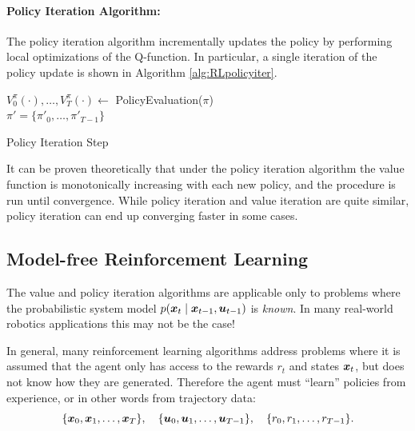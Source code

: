 \paragraph{Policy Iteration Algorithm:}
The policy iteration algorithm incrementally updates the policy by performing local optimizations of the Q-function. In particular, a single iteration of the policy update is shown in Algorithm \ref{alg:RLpolicyiter}.
\begin{algorithm}[ht]
 \KwData{$\pi$}
 $V^\pi_0(\cdot),\dots,V^\pi_T(\cdot) \xleftarrow{}$ PolicyEvaluation($\pi$)\\
 \Return $\pi' = \{\pi'_0, \dots, \pi'_{T-1} \}$
 \caption{Policy Iteration Step}
 \label{alg:RLpolicyiter}
\end{algorithm}
It can be proven theoretically that under the policy iteration algorithm the value function is monotonically increasing with each new policy, and the procedure is run until convergence.
While policy iteration and value iteration are quite similar, policy iteration can end up converging faster in some cases.

\subsection{Model-free Reinforcement Learning}
The value and policy iteration algorithms are applicable only to problems where the probabilistic system model $p(\bm{x}_t \mid \bm{x}_{t-1}, \bm{u}_{t-1})$ is \textit{known}. In many real-world robotics applications this may not be the case!

In general, many reinforcement learning algorithms address problems where it is assumed that the agent only has access to the rewards $r_t$ and states $\bm{x}_t$, but does not know how they are generated. Therefore the agent must ``learn'' policies from experience, or in other words from trajectory data:
\begin{equation*}
\{\bm{x}_0, \bm{x}_1, \dots, \bm{x}_T \}, \quad \{\bm{u}_0, \bm{u}_1, \dots, \bm{u}_{T-1} \}, \quad \{r_0, r_1, \dots, r_{T-1} \}.
\end{equation*}

